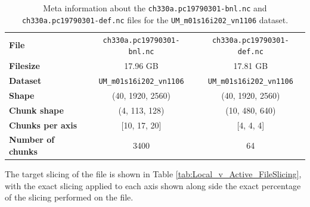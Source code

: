 \documentclass{article}
\begin{document}
\begin{table}[h!] 
    \centering 
    \renewcommand{\arraystretch}{1.1}
    \begin{tabular}{lcc}  \hline
        \textbf{File}                   & \texttt{ch330a.pc19790301-bnl.nc}    & \texttt{ch330a.pc19790301-def.nc}   \\  
        \textbf{Filesize}                   & 17.96  GB  & 17.81  GB   \\  
        \textbf{Dataset}                & \texttt{UM\_m01s16i202\_vn1106}                 &  \texttt{UM\_m01s16i202\_vn1106}                \\ 
        \textbf{Shape}                  & (40, 1920, 2560)                                &  (40, 1920, 2560)                               \\ 
        \textbf{Chunk shape}            & (4, 113, 128)                                   &  (10, 480, 640)                                 \\ 
        \textbf{Chunks per axis}        & [10, 17, 20]                                    &  [4, 4, 4]                                      \\ 
        \textbf{Number of chunks} & 3400                                                  &  64                                             \\  \hline
    \end{tabular} 
    \caption{Meta information about the \texttt{ch330a.pc19790301-bnl.nc} and  \texttt{ch330a.pc19790301-def.nc} files for the \texttt{UM\_m01s16i202\_vn1106} dataset.} 
    \label{tab:FileInfo_ch330a.pc19790301-bnl-def.nc} 
\end{table}

The target slicing of the file is shown in Table \ref{tab:Local_v_Active_FileSlicing}, with the exact slicing applied to each axis shown along side the exact percentage of the slicing performed on the file. 
\end{document}
